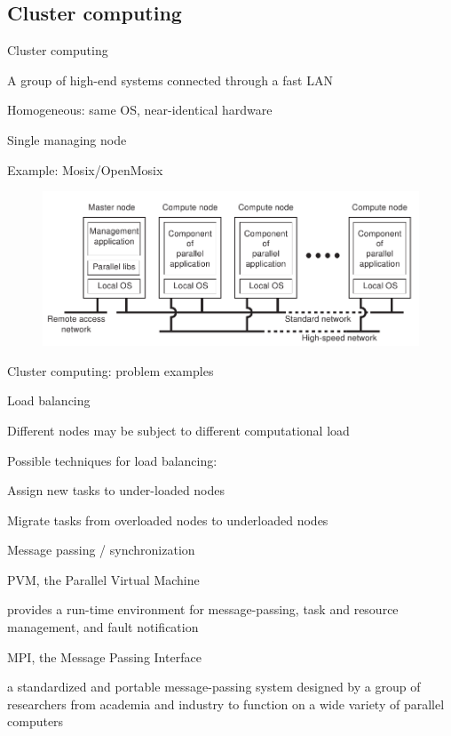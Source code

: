 \subsection{Cluster computing}

\begin{frame}{Cluster computing}
	
\BI
\item A group of high-end systems connected through a fast LAN
\item Homogeneous: same OS, near-identical hardware
\item Single managing node
\item Example: Mosix/OpenMosix
\EI

\begin{figure}
\includegraphics[width=\textwidth]{figs/01/cluster.png}	
\end{figure}

\end{frame}

\begin{frame}{Cluster computing: problem examples}

\begin{block}{Load balancing}
\BI
\item Different nodes may be subject to different computational load
\item Possible techniques for load balancing:
  \BI
  \item Assign new tasks to under-loaded nodes
  \item Migrate tasks from overloaded nodes to underloaded nodes
  \EI
\EI

\end{block}

\begin{block}{Message passing / synchronization}
\BI
\item PVM, the Parallel Virtual Machine
\BI
\item provides a run-time environment for message-passing, task and resource management, and fault notification
\EI
\item MPI, the Message Passing Interface
\BI
\item a standardized and portable message-passing system designed by a group of researchers from academia and industry to function on a wide variety of parallel computers
\EI
\EI
\end{block}

\end{frame}

